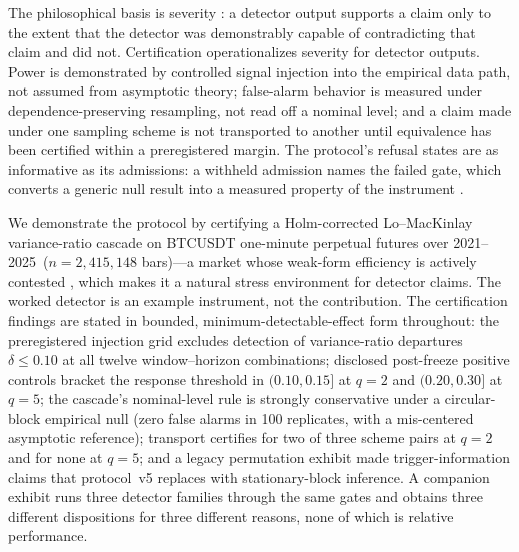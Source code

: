 \documentclass[3p]{elsarticle}
\newcommand{\dataspan}{2021--2025}
\newcommand{\numbars}{2{,}415{,}148}
\begin{document}
The philosophical basis is severity \citep{Mayo2018,MayoSpanos2006}: a
detector output supports a claim only to the extent that the detector was
demonstrably capable of contradicting that claim and did not. Certification
operationalizes severity for detector outputs. Power is demonstrated by
controlled signal injection into the empirical data path, not assumed from
asymptotic theory; false-alarm behavior is measured under dependence-preserving
resampling, not read off a nominal level; and a claim made under one
sampling scheme is not transported to another until equivalence has been
certified within a preregistered margin. The protocol's refusal states are as
informative as its admissions: a withheld admission names the failed gate,
which converts a generic null result into a measured property of the
instrument \citep{Harvey2017}.

We demonstrate the protocol by certifying a Holm-corrected Lo--MacKinlay
variance-ratio cascade \citep{LoMacKinlay1988,Holm1979} on BTCUSDT one-minute
perpetual futures over \dataspan\ ($n=\numbars$ bars)---a market whose weak-form
efficiency is actively contested \citep{Urquhart2016,NadarajahChu2017}, which
makes it a natural stress environment for detector claims. The worked
detector is an example instrument, not the contribution. The certification
findings are stated in bounded, minimum-detectable-effect form throughout: the
preregistered injection grid excludes detection of variance-ratio departures
$\delta\le 0.10$ at all twelve window--horizon combinations; disclosed
post-freeze positive controls bracket the response threshold in
$(0.10,0.15]$ at $q{=}2$ and $(0.20,0.30]$ at $q{=}5$; the cascade's
nominal-level rule is strongly conservative under a circular-block empirical
null (zero false alarms in 100 replicates, with a mis-centered asymptotic
reference); transport certifies for two of three scheme pairs at $q{=}2$ and
for none at $q{=}5$; and a legacy permutation exhibit
made trigger-information claims that protocol~v5 replaces with
stationary-block inference. A companion exhibit runs three detector families through the
same gates and obtains three different dispositions for three different
reasons, none of which is relative performance.
\end{document}
